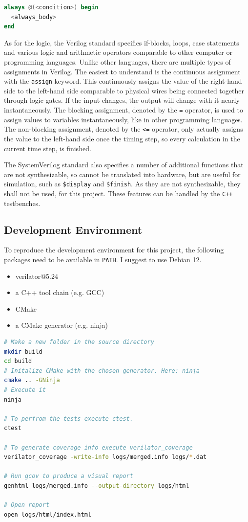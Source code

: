 \begin{lstlisting}[language=Verilog, caption=Always block definition]
always @(<condition>) begin
  <always_body>
end

\end{lstlisting}

As for the logic, the Verilog standard specifies if-blocks, loops, case statements and various logic and arithmetic operators comparable to other computer or programming languages. Unlike other languages, there are multiple types of assignments in Verilog. The easiest to understand is the continuous assignment with the \texttt{assign} keyword. This continuously assigns the value of the right-hand side to the left-hand side comparable to physical wires being connected together through logic gates. If the input changes, the output will change with it nearly instantaneously. The blocking assignment, denoted by the \texttt{=} operator, is used to assign values to variables instantaneously, like in other programming languages. The non-blocking assignment, denoted by the \texttt{<=} operator, only actually assigns the value to the left-hand side once the timing step, so every calculation in the current time step, is finished. 


The SystemVerilog standard also specifies a number of additional functions that are not synthesizable, so cannot be translated into hardware, but are useful for simulation, such as \texttt{\$display} and \texttt{\$finish}. As they are not synthesizable, they shall not be used, for this project. These features can be handled by the \texttt{C++} testbenches.



\subsection{Development Environment}
To reproduce the development environment for this project, the following packages need to be available in \texttt{PATH}. I suggest to use Debian 12. 

\begin{itemize}
  \item verilator@5.24
  \item a C++ tool chain (e.g. GCC)
  \item CMake
  \item a CMake generator (e.g. ninja)
\end{itemize}  
\pagebreak
\begin{lstlisting}[caption=Build instructions, language=bash, label=lst:build]
# Make a new folder in the source directory
mkdir build
cd build
# Initalize CMake with the chosen generator. Here: ninja
cmake .. -GNinja
# Execute it
ninja

# To perfrom the tests execute ctest.
ctest

# To generate coverage info execute verilator_coverage
verilator_coverage -write-info logs/merged.info logs/*.dat

# Run gcov to produce a visual report
genhtml logs/merged.info --output-directory logs/html

# Open report
open logs/html/index.html
\end{lstlisting}


